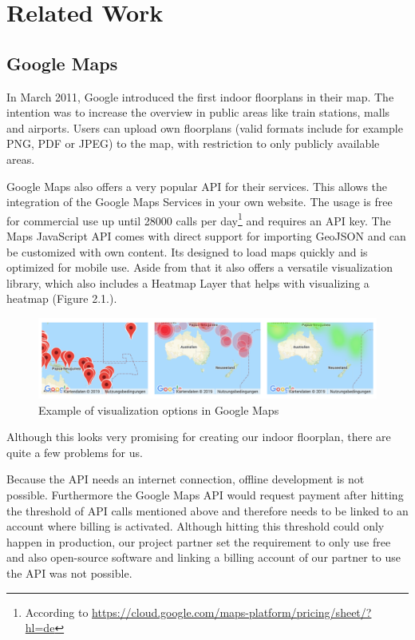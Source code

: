 \section{Related Work}

\subsection{Google Maps}
\label{Google Maps}

In March 2011, Google introduced the first indoor floorplans in their map. The intention was to increase the overview in public areas like train stations, malls and airports.
Users can upload own floorplans (valid formats include for example PNG, PDF or JPEG) to the map, with restriction to only publicly available areas.

Google Maps also offers a very popular API for their services. This allows the integration of the Google Maps Services in your own website. The usage is free for commercial use up until 28000 calls per day\footnote{According to \url{https://cloud.google.com/maps-platform/pricing/sheet/?hl=de}} and requires an API key.
The Maps JavaScript API comes with direct support for importing GeoJSON and can be customized with own content. Its designed to load maps quickly and is optimized for mobile use. Aside from that it also offers a versatile visualization library, which also includes a Heatmap Layer that helps with visualizing a heatmap (Figure 2.1.).

\begin{figure}[!hb]
	\centering
	\includegraphics[width=1\linewidth]{images/GoogleMapsHeatmap}
	\caption{Example of visualization options in Google Maps}
	\label{fig:GoogleMapsHeatmap}
\end{figure}

Although this looks very promising for creating our indoor floorplan, there are quite a few problems for us.

Because the API needs an internet connection, offline development is not possible. 
Furthermore the Google Maps API would request payment after hitting the threshold of API calls mentioned above and therefore needs to be linked to an account where billing is activated. Although hitting this threshold could only happen in production, our project partner set the requirement to only use free and also open-source software and linking a billing account of our partner to use the API was not possible. 

